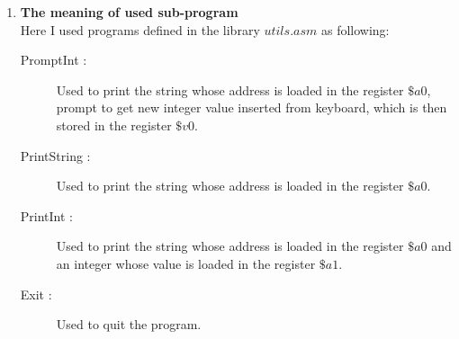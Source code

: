 \documentclass[12pt]{article}
\begin{document}
\begin{enumerate}[label=\textbf{\Roman*}]
        \item \textbf{The meaning of used sub-program}\\
        Here I used programs defined in the library $utils.asm$ as following:
        \begin{description}
        	\item [PromptInt :] Used to print the string whose address is loaded in the register $\$a0$, prompt to get new integer value inserted from keyboard, which is then stored in the register $\$v0$.
        	\item[PrintString :] Used to print the string whose address is loaded in the register $\$a0$.
        	\item[PrintInt :] Used to print the string whose address is loaded in the register $\$a0$ and an integer whose value is loaded in the register $\$a1$.
        	\item[Exit :] Used to quit the program.
        \end{description}
\end{enumerate}
\end{document}
